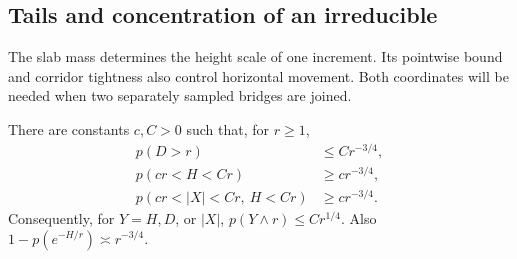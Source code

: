 \subsection{Tails and concentration of an irreducible}

The slab mass determines the height scale of one increment.  Its
pointwise bound and corridor tightness also control horizontal movement.
Both coordinates will be needed when two separately sampled bridges
are joined.

\begin{lemma}\label{R:geo:increment-tails}
There are constants $c,C>0$ such that, for $r\ge1$,
\begin{align}
 p(D>r)&\le Cr^{-3/4},\label{R:geo:D-tail}\\
 p(c r<H<C r)&\ge c r^{-3/4},\label{R:geo:H-shell}\\
 p(c r<|X|<C r,\ H<C r)&\ge c r^{-3/4}.
 \label{R:geo:X-shell}
\end{align}
Consequently, for $Y=H,D$, or $|X|$,
$p(Y\wedge r)\le C r^{1/4}$.  Also
$1-p(e^{-H/r})\asymp r^{-3/4}$.
\end{lemma}
